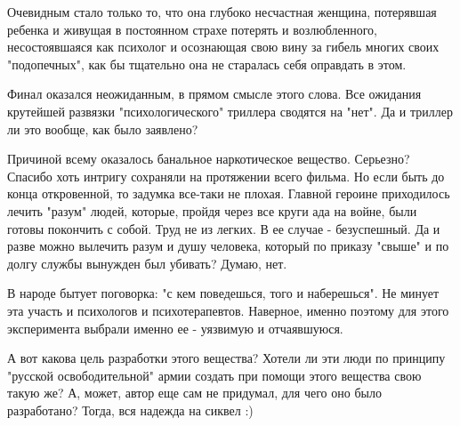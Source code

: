 Очевидным стало только то, что она глубоко несчастная женщина, потерявшая
ребенка и живущая в постоянном страхе потерять и возлюбленного, несостоявшаяся
как психолог и осознающая свою вину за гибель многих своих "подопечных", как бы
тщательно она не старалась себя оправдать в этом.

Финал оказался неожиданным, в прямом смысле этого слова. Все ожидания крутейшей
развязки "психологического" триллера сводятся на "нет". Да и триллер ли это
вообще, как было заявлено?

Причиной всему оказалось банальное наркотическое вещество. Серьезно? Спасибо
хоть интригу сохраняли на протяжении всего фильма. Но если быть до конца
откровенной, то задумка все-таки не плохая. Главной героине приходилось лечить
"разум" людей, которые, пройдя через все круги ада на войне, были готовы
покончить с собой. Труд не из легких.  В ее случае - безуспешный. Да и разве
можно вылечить разум и душу человека, который по приказу "свыше" и по долгу
службы вынужден был убивать? Думаю, нет.

В народе бытует поговорка: "с кем поведешься, того и наберешься". Не минует эта
участь и психологов и психотерапевтов. Наверное, именно поэтому для этого
эксперимента выбрали именно ее - уязвимую и отчаявшуюся.  

А вот какова цель разработки этого вещества? Хотели ли эти люди по принципу
"русской освободительной" армии создать при помощи этого вещества свою такую
же? А, может, автор еще сам не придумал, для чего оно было разработано?  Тогда,
вся надежда на сиквел :)

